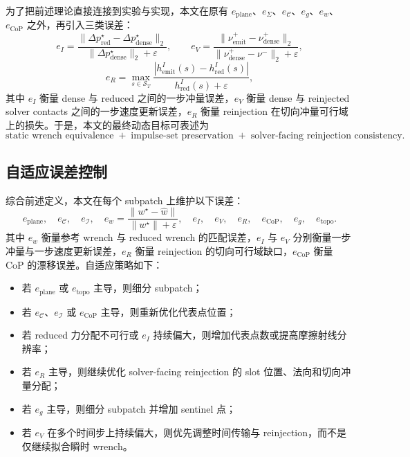 为了把前述理论直接连接到实验与实现，本文在原有 $e_{\mathrm{plane}}$、$e_{\Sigma}$、$e_{\mathcal{C}}$、$e_g$、$e_w$、$e_{\mathrm{CoP}}$ 之外，再引入三类误差：
\begin{equation}
e_I
=
\frac{\|\Delta p_{\mathrm{red}}^\star-\Delta p_{\mathrm{dense}}^\star\|_2}
{\|\Delta p_{\mathrm{dense}}^\star\|_2+\varepsilon},
\qquad
e_V
=
\frac{\|\nu_{\mathrm{emit}}^{+}-\nu_{\mathrm{dense}}^{+}\|_2}
{\|\nu_{\mathrm{dense}}^{+}-\nu^{-}\|_2+\varepsilon},
\end{equation}
\begin{equation}
e_R
=
\max_{s\in\mathcal{S}_{T}}
\frac{|h_{\mathrm{emit}}^{I}(s)-h_{\mathrm{red}}^{I}(s)|}
{h_{\mathrm{red}}^{I}(s)+\varepsilon},
\end{equation}
其中 $e_I$ 衡量 dense 与 reduced 之间的一步冲量误差，$e_V$ 衡量 dense 与 reinjected solver contacts 之间的一步速度更新误差，$e_R$ 衡量 reinjection 在切向冲量可行域上的损失。于是，本文的最终动态目标可表述为
\begin{equation}
\text{static wrench equivalence}
\;+\;
\text{impulse-set preservation}
\;+\;
\text{solver-facing reinjection consistency}.
\end{equation}

\subsection{自适应误差控制}

综合前述定义，本文在每个 subpatch 上维护以下误差：
\begin{equation}
 e_{\mathrm{plane}},\quad
 e_{\mathcal{C}},\quad
 e_{\mathcal{I}},\quad
 e_w=
 \frac{\|w^\star-\hat{w}\|}{\|w^\star\|+\varepsilon},\quad
 e_I,\quad
 e_V,\quad
 e_R,\quad
 e_{\mathrm{CoP}},\quad
 e_g,\quad
 e_{\mathrm{topo}}.
\end{equation}
其中 $e_w$ 衡量参考 wrench 与 reduced wrench 的匹配误差，$e_I$ 与 $e_V$ 分别衡量一步冲量与一步速度更新误差，$e_R$ 衡量 reinjection 的切向可行域缺口，$e_{\mathrm{CoP}}$ 衡量 CoP 的漂移误差。自适应策略如下：
\begin{itemize}[leftmargin=2em]
    \item 若 $e_{\mathrm{plane}}$ 或 $e_{\mathrm{topo}}$ 主导，则细分 subpatch；
    \item 若 $e_{\mathcal{C}}$、$e_{\mathcal{I}}$ 或 $e_{\mathrm{CoP}}$ 主导，则重新优化代表点位置；
    \item 若 reduced 力分配不可行或 $e_I$ 持续偏大，则增加代表点数或提高摩擦射线分辨率；
    \item 若 $e_R$ 主导，则继续优化 solver-facing reinjection 的 slot 位置、法向和切向冲量分配；
    \item 若 $e_g$ 主导，则细分 subpatch 并增加 sentinel 点；
    \item 若 $e_V$ 在多个时间步上持续偏大，则优先调整时间传输与 reinjection，而不是仅继续拟合瞬时 wrench。
\end{itemize}

